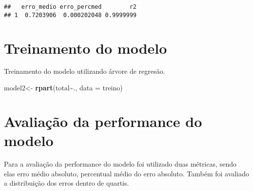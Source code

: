 \documentclass[
]{article}
\newenvironment{Shaded}{\begin{snugshade}}{\end{snugshade}}
\newcommand{\CommentTok}[1]{\textcolor[rgb]{0.56,0.35,0.01}{\textit{#1}}}
\newcommand{\DataTypeTok}[1]{\textcolor[rgb]{0.13,0.29,0.53}{#1}}
\newcommand{\KeywordTok}[1]{\textcolor[rgb]{0.13,0.29,0.53}{\textbf{#1}}}
\newcommand{\NormalTok}[1]{#1}
\newcommand{\OperatorTok}[1]{\textcolor[rgb]{0.81,0.36,0.00}{\textbf{#1}}}
\newcommand{\StringTok}[1]{\textcolor[rgb]{0.31,0.60,0.02}{#1}}
\begin{document}
\begin{Shaded}
\end{Shaded}

\begin{verbatim}
##   erro_medio erro_percmed        r2
## 1  0.7203906  0.000202048 0.9999999
\end{verbatim}

\hypertarget{treinamento-do-modelo-1}{%
\section{Treinamento do modelo}\label{treinamento-do-modelo-1}}

Treinamento do modelo utilizando árvore de regresão.

\begin{Shaded}
\begin{Highlighting}[]
\NormalTok{model2\textless{}{-}}\StringTok{ }\KeywordTok{rpart}\NormalTok{(total}\OperatorTok{\textasciitilde{}}\NormalTok{., }\DataTypeTok{data =}\NormalTok{ treino)}
\end{Highlighting}
\end{Shaded}

\hypertarget{avaliauxe7uxe3o-da-performance-do-modelo-1}{%
\section{Avaliação da performance do
modelo}\label{avaliauxe7uxe3o-da-performance-do-modelo-1}}

Para a avaliação da performance do modelo foi utilizado duas métricas,
sendo elas erro médio absoluto, percentual médio do erro absoluto.
Também foi avaliado a distribuição dos erros dentro de quartis.
\end{document}
